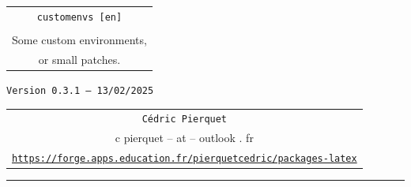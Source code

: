 \documentclass[english,11pt,a4paper]{article}
\def\TPversion{0.3.1}
\def\TPdate{13/02/2025}
\begin{document}
\pagestyle{fancy}

\thispagestyle{empty}

\begin{center}
	\begin{minipage}{0.75\linewidth}
	\begin{tcolorbox}[colframe=yellow,colback=yellow!15]
		\begin{center}
			\renewcommand\arraystretch{1.25}
			\begin{tabular}{c}
				{\Huge \texttt{customenvs [en]}}\\
				\\
				{\Large Some custom environments,} \\
				{\Large or small patches.} \\
			\end{tabular}
			\renewcommand\arraystretch{1}
			
			\medskip
			
			{\small \texttt{Version \TPversion{} -- \TPdate}}
		\end{center}
	\end{tcolorbox}
\end{minipage}
\end{center}

\vspace*{1mm}

\begin{center}
	\begin{tabular}{c}
	\texttt{Cédric Pierquet}\\
	{\ttfamily c pierquet -- at -- outlook . fr}\\
	\texttt{\url{https://forge.apps.education.fr/pierquetcedric/packages-latex}}
\end{tabular}
\end{center}

\vspace*{5mm}

%
%
%
%
%

\hrule


\hypertarget{matoc}{}

\tableofcontents

\vspace*{5mm}
\end{document}
